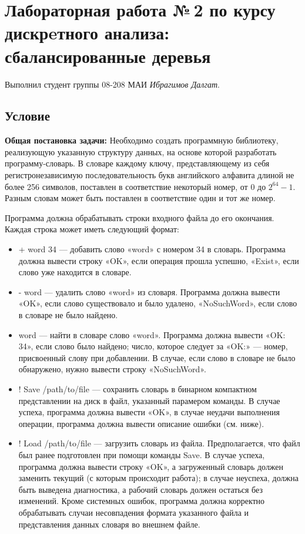 \documentclass[12pt]{article}
\begin{document}
\section*{Лабораторная работа №\,2 по курсу дискрeтного анализа: сбалансированные деревья}

\noindent Выполнил студент группы 08-208 МАИ \textit{Ибрагимов Далгат}.

\subsection*{Условие}
\textbf{Общая постановка задачи:} Необходимо создать программную библиотеку, реализующую указанную структуру данных, на основе которой разработать программу-словарь. В словаре каждому ключу, представляющему из себя регистронезависимую последовательность букв английского алфавита длиной не более 256 символов, поставлен в соответствие некоторый номер, от 0 до ${2^{64} - 1}$. Разным словам может быть поставлен в соответствие один и тот же номер.

Программа должна обрабатывать строки входного файла до его окончания. Каждая строка может иметь следующий формат:
\begin{itemize}
\item + word 34 — добавить слово «word» с номером 34 в словарь. Программа должна вывести строку «OK», если операция прошла успешно, «Exist», если слово уже находится в словаре.
\item - word — удалить слово «word» из словаря. Программа должна вывести «OK», если слово существовало и было удалено, «NoSuchWord», если слово в словаре не было найдено.
\item word — найти в словаре слово «word». Программа должна вывести «OK: 34», если слово было найдено; число, которое следует за «OK:» — номер, присвоенный слову при добавлении. В случае, если слово в словаре не было обнаружено, нужно вывести строку «NoSuchWord».
\item ! Save /path/to/file — сохранить словарь в бинарном компактном представлении на диск в файл, указанный парамером команды. В случае успеха, программа должна вывести «OK», в случае неудачи выполнения операции, программа должна вывести описание ошибки (см. ниже).
\item ! Load /path/to/file — загрузить словарь из файла. Предполагается, что файл был ранее подготовлен при помощи команды Save. В случае успеха, программа должна вывести строку «OK», а загруженный словарь должен заменить текущий (с которым происходит работа); в случае неуспеха, должна быть выведена диагностика, а рабочий словарь должен остаться без изменений. Кроме системных ошибок, программа должна корректно обрабатывать случаи несовпадения формата указанного файла и представления данных словаря во внешнем файле.
\end{itemize}
\end{document}
